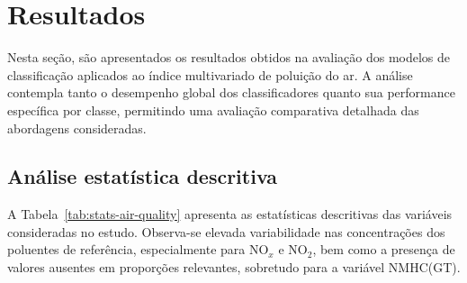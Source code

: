 \section{Resultados}
\label{sec:resultados}

Nesta seção, são apresentados os resultados obtidos na avaliação dos modelos de classificação aplicados ao índice multivariado de poluição do ar. A análise contempla tanto o desempenho global dos classificadores quanto sua performance específica por classe, permitindo uma avaliação comparativa detalhada das abordagens consideradas.

\subsection{Análise estatística descritiva}
\label{subsec:estatistica_descritiva}

A Tabela~\ref{tab:stats-air-quality} apresenta as estatísticas descritivas das variáveis consideradas no estudo. Observa-se elevada variabilidade nas concentrações dos poluentes de referência, especialmente para NO$_x$ e NO$_2$, bem como a presença de valores ausentes em proporções relevantes, sobretudo para a variável NMHC(GT).

